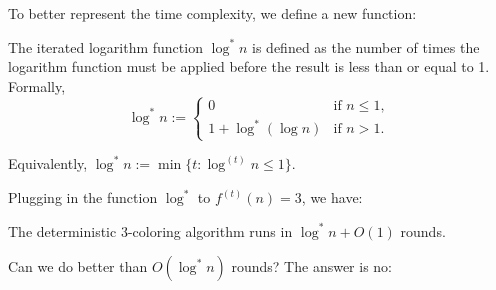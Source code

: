 To better represent the time complexity, we define a new function:

\begin{definition}
  The iterated logarithm function $\log^* n$ is defined as the number of times the logarithm function must be applied before the result is less than or equal to 1. Formally,
  \[
    \log^* n := \begin{cases}
      0 & \text{if } n \leq 1, \\
      1 + \log^*(\log n) & \text{if } n > 1.
    \end{cases}
  \]

  Equivalently, $\log^* n := \min\{t : \log^{(t)} n \leq 1\}$.
\end{definition}

Plugging in the function $\log^*$ to $f^{(t)}(n) = 3$, we have:
\begin{theorem}
  The deterministic 3-coloring algorithm runs in $\log^* n + O(1)$ rounds.
\end{theorem}

Can we do better than $O(\log^* n)$ rounds? The answer is no:

